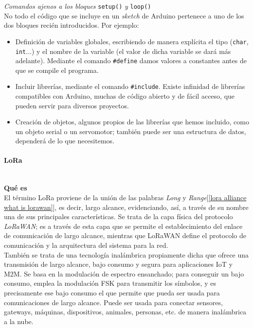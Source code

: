 \documentclass[12pt]{article}
\newcommand{\subsubsubsection}[1]{\paragraph{#1}\mbox{}\\}
\begin{document}
	\noindent \textit{Comandos ajenos a los bloques} \texttt{setup()} \textit{y} \texttt{loop()}\\
	
	\noindent No todo el código que se incluye en un \textit{sketch}  de Arduino pertenece a uno de los dos bloques recién introducidos. Por ejemplo:
	
	\begin{itemize}
		\item Definición de variables globales, escribiendo de manera explícita el tipo (\texttt{char}, \texttt{int}...) y el nombre de la variable (el valor de dicha variable se dará más adelante). Mediante el comando \texttt{\#define} damos valores a constantes antes de que se compile el programa.
		\item Incluir librerías, mediante el comando \texttt{\#include}. Existe infinidad de librerías compatibles con Arduino, muchas de código abierto y de fácil acceso, que pueden servir para diversos proyectos. 
		\item Creación de objetos, algunos propios de las librerías que hemos incluido, como un objeto serial o un servomotor; también puede ser una estructura de datos, dependerá de lo que necesitemos.
	\end{itemize} 
	
	\subsubsubsection{LoRa}
	
	\noindent \textbf{Qué es}\\
	
	\noindent El término LoRa proviene de la unión de las palabras \textit{Long} y \textit{Range}[\ref{lora alliance what is lorawan}], es decir, largo alcance, evidenciando, así, a través de su nombre una de sus principales características. Se trata de la capa física del protocolo \textit{LoRaWAN}; es a través de esta capa que se permite el establecimiento del enlace de comunicación de largo alcance, mientras que LoRaWAN define el protocolo de comunicación y la arquitectura del sistema para la red. \\
	
	\noindent También se trata de una tecnología inalámbrica propiamente dicha que ofrece una transmisión de largo alcance, bajo consumo y segura para aplicaciones IoT y M2M. Se basa en la modulación de espectro ensanchado; para conseguir un bajo consumo, emplea la modulación FSK para transmitir los símbolos, y es precisamente ese bajo consumo el que permite que pueda ser usada para comunicaciones de largo alcance. Puede ser usada para conectar sensores, gateways, máquinas, dispositivos, animales, personas, etc. de manera inalámbrica a la nube.\\
	
\end{document}
